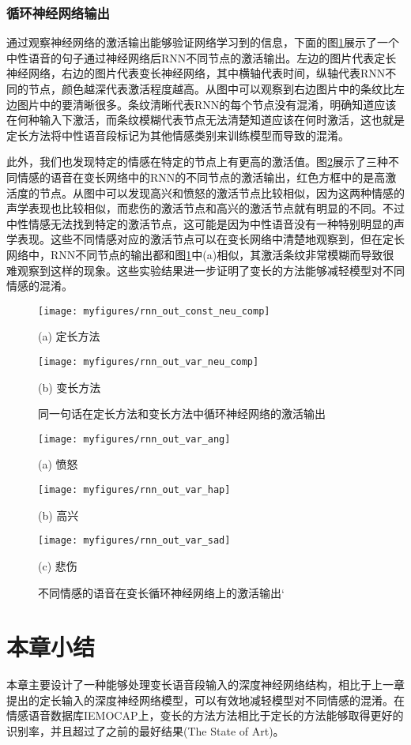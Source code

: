 \subsubsection{循环神经网络输出}
\label{sec:var_len_experiement_rnn}

通过观察神经网络的激活输出能够验证网络学习到的信息，下面的图\ref{fig:rnn_out_comp}展示了一个中性语音的句子通过神经网络后RNN不同节点的激活输出。左边的图片代表定长神经网络，右边的图片代表变长神经网络，其中横轴代表时间，纵轴代表RNN不同的节点，颜色越深代表激活程度越高。从图中可以观察到右边图片中的条纹比左边图片中的要清晰很多。条纹清晰代表RNN的每个节点没有混淆，明确知道应该在何种输入下激活，而条纹模糊代表节点无法清楚知道应该在何时激活，这也就是定长方法将中性语音段标记为其他情感类别来训练模型而导致的混淆。

此外，我们也发现特定的情感在特定的节点上有更高的激活值。图\ref{fig:rnn_out_emotions}展示了三种不同情感的语音在变长网络中的RNN的不同节点的激活输出，红色方框中的是高激活度的节点。从图中可以发现高兴和愤怒的激活节点比较相似，因为这两种情感的声学表现也比较相似，而悲伤的激活节点和高兴的激活节点就有明显的不同。不过中性情感无法找到特定的激活节点，这可能是因为中性语音没有一种特别明显的声学表现。这些不同情感对应的激活节点可以在变长网络中清楚地观察到，但在定长网络中，RNN不同节点的输出都和图\ref{fig:rnn_out_comp}中(a)相似，其激活条纹非常模糊而导致很难观察到这样的现象。这些实验结果进一步证明了变长的方法能够减轻模型对不同情感的混淆。

\begin{figure}[htb]
\begin{minipage}{0.48\textwidth}
    \centering
    \texttt{[image: myfigures/rnn\_out\_const\_neu\_comp]}
    \centerline{(a) 定长方法}\medskip
\end{minipage}\hfill
\begin{minipage}{0.48\textwidth}
    \centering
    \texttt{[image: myfigures/rnn\_out\_var\_neu\_comp]}
    \centerline{(b) 变长方法}\medskip
\end{minipage}
\caption{同一句话在定长方法和变长方法中循环神经网络的激活输出}
\label{fig:rnn_out_comp}
\end{figure}

\begin{figure}[htb]
\begin{minipage}{0.33\textwidth}
    \centering
    \texttt{[image: myfigures/rnn\_out\_var\_ang]}
    \centerline{(a) 愤怒}\medskip
\end{minipage}\hfill
\begin{minipage}{0.33\textwidth}
    \centering
    \texttt{[image: myfigures/rnn\_out\_var\_hap]}
    \centerline{(b) 高兴}\medskip
\end{minipage}
\begin{minipage}{0.33\textwidth}
    \centering
    \texttt{[image: myfigures/rnn\_out\_var\_sad]}
    \centerline{(c) 悲伤}\medskip
\end{minipage}
\caption{不同情感的语音在变长循环神经网络上的激活输出‘}
\label{fig:rnn_out_emotions}
\end{figure}

\section{本章小结}
\label{sec:var_len_summary}

本章主要设计了一种能够处理变长语音段输入的深度神经网络结构，相比于上一章提出的定长输入的深度神经网络模型，可以有效地减轻模型对不同情感的混淆。在情感语音数据库IEMOCAP上，变长的方法方法相比于定长的方法能够取得更好的识别率，并且超过了之前的最好结果(The State of Art)。